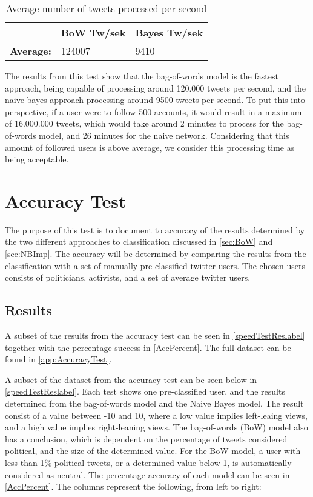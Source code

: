 \begin{table}[H]\centering
\begin{tabular}{|l|l|l|}\hline
					&	\textbf{BoW Tw/sek}	&	\textbf{Bayes Tw/sek}	\\\hline
\textbf{Average:}	&	124007				&	9410 					\\\hline	
\end{tabular}
\caption{Average number of tweets processed per second}
\label{AvgTweetsPs}
\end{table}

The results from this test show that the bag-of-words model is the fastest
approach, being capable of processing around 120.000 tweets per second, and the
naive bayes approach processing around 9500 tweets per second. To put this into
perspective, if a user were to follow 500 accounts, it would result in a maximum
of 16.000.000 tweets, which would take around 2 minutes to process for the
bag-of-words model, and 26 minutes for the naive network. Considering that this
amount of followed users is above average, we consider this processing time as
being acceptable.

\section{Accuracy Test}
The purpose of this test is to document to accuracy of the results determined
by the two different approaches to classification discussed in \autoref{sec:BoW}
and \autoref{sec:NBImp}. The accuracy will be determined by comparing the
results from the classification with a set of manually pre-classified
twitter users. The chosen users consists of politicians, activists, and a set of
average twitter users.

\subsection*{Results}
A subset of the results from the accuracy test can be seen in
\autoref{speedTestReslabel} together with the percentage success in
\autoref{AccPercent}. The full dataset can be found in
\autoref{app:AccuracyTest}.\nl

A subset of the dataset from the accuracy test can be seen below in
\autoref{speedTestReslabel}. Each test shows one pre-classified user, and the
results determined from the bag-of-words model and the Naive Bayes model. The
result consist of a value between -10 and 10, where a low value implies
left-leaing views, and a high value implies right-leaning views. The
bag-of-words (BoW) model also has a conclusion, which is dependent on the
percentage of tweets considered political, and the size of the determined value.
For the BoW model, a user with less than 1\% political tweets, or a determined
value below 1, is automatically considered as neutral. The percentage accuracy
of each model can be seen in \autoref{AccPercent}.
The columns represent the following, from left to right:\nl

